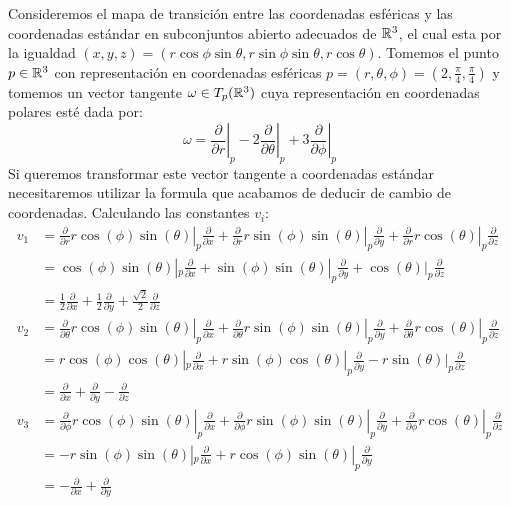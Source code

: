 \begin{example}
	Consideremos el mapa de transición entre las coordenadas esféricas y las coordenadas estándar en subconjuntos abierto adecuados de $\mathbb{R}^{3}$, el cual esta por la igualdad $(x,y,z) = (r \cos \phi \sin \theta, r \sin \phi \sin \theta, r\cos \theta)$. Tomemos el punto $p \in \mathbb{R}^{3}$ con representación en coordenadas esféricas $p = (r,\theta,\phi) = (2,\frac{\pi}{4},\frac{\pi}{4})$ y tomemos un vector tangente $\omega \in T_p(\mathbb{R}^3)$ cuya representación en coordenadas polares esté dada por:
	\[
		\omega = \left. \frac{\partial}{\partial r} \right|_p -
		\left. 2\frac{\partial}{\partial \theta} \right|_p +
		\left. 3\frac{\partial}{\partial \phi} \right|_p
	\]
	Si queremos transformar este vector tangente a coordenadas estándar necesitaremos utilizar la formula que acabamos de deducir de cambio de coordenadas. Calculando las constantes $v_i$:
	\begin{align*}
		v_1 & =
		\left. \frac{\partial}{\partial r} r\cos(\phi)\sin(\theta) \right|_p
		\frac{\partial}{\partial x} +
		\left. \frac{\partial}{\partial r} r\sin(\phi)\sin(\theta)\right|_p
		\frac{\partial}{\partial y} +
		\left. \frac{\partial}{\partial r}r\cos(\theta)\right|_{p}
		\frac{\partial}{\partial z}                                         \\
		    & = \cos(\phi)\sin(\theta)|_p \frac{\partial}{\partial x}
		+ \sin(\phi)\sin(\theta)|_p  \frac{\partial}{\partial y}
		+ \cos(\theta)|_p \frac{\partial}{\partial z}                       \\
		    & = \frac{1}{2} \frac{\partial}{\partial x}
		+ \frac{1}{2} \frac{\partial}{\partial y}
		+ \frac{\sqrt{2}}{2} \frac{\partial}{\partial z}                    \\
		v_2 & =
		\left. \frac{\partial}{\partial \theta} r\cos(\phi)\sin(\theta) \right|_p
		\frac{\partial}{\partial x} +
		\left. \frac{\partial}{\partial \theta} r\sin(\phi)\sin(\theta)\right|_p
		\frac{\partial}{\partial y} +
		\left. \frac{\partial}{\partial \theta}r\cos(\theta)\right|_{p}
		\frac{\partial}{\partial z}                                         \\
		    & = r\cos(\phi)\cos(\theta)|_p \frac{\partial}{\partial x}
		+ r\sin(\phi)\cos(\theta)|_p  \frac{\partial}{\partial y}
		- r\sin(\theta)|_p \frac{\partial}{\partial z}                      \\
		    & = \frac{\partial}{\partial x} + \frac{\partial }{\partial y}
		- \frac{\partial}{\partial z}                                       \\
		v_3 & =
		\left. \frac{\partial}{\partial \phi} r\cos(\phi)\sin(\theta) \right|_p
		\frac{\partial}{\partial x} +
		\left. \frac{\partial}{\partial \phi} r\sin(\phi)\sin(\theta)\right|_p
		\frac{\partial}{\partial y} +
		\left. \frac{\partial}{\partial \phi} r\cos(\theta)\right|_{p}
		\frac{\partial}{\partial z}                                         \\
		    & = -r\sin(\phi)\sin(\theta)|_p \frac{\partial}{\partial x}
		+ r\cos(\phi)\sin(\theta)|_p  \frac{\partial}{\partial y}           \\
		    & = - \frac{\partial}{\partial x} + \frac{\partial}{\partial y}
	\end{align*}


\end{example}
